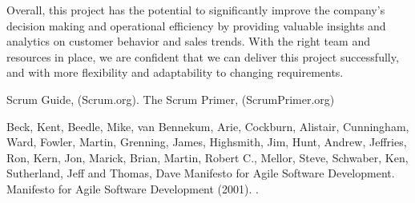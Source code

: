 \documentclass[a4paper,12pt]{article}
\begin{document}
Overall, this project has the potential to significantly improve the company's decision making and operational efficiency by providing valuable insights and analytics on customer behavior and sales trends.
With the right team and resources in place, we are confident that we can deliver this project successfully, and with more flexibility and adaptability to changing requirements.


\begin{thebibliography}{9}
Scrum Guide, (Scrum.org).
The Scrum Primer, (ScrumPrimer.org)

Beck, Kent, Beedle, Mike, van Bennekum, Arie, Cockburn, Alistair, Cunningham, Ward, Fowler, Martin, Grenning, James, Highsmith, Jim, Hunt, Andrew, Jeffries, Ron, Kern, Jon, Marick, Brian, Martin, Robert C., Mellor, Steve, Schwaber, Ken, Sutherland, Jeff and Thomas, Dave Manifesto for Agile Software Development. Manifesto for Agile Software Development (2001). .
\end{thebibliography}
\end{document}
